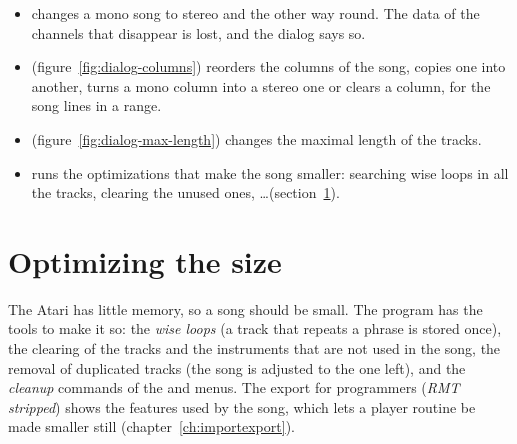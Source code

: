 \begin{itemize}
  \item {} changes a mono song to stereo and the other way round.
        The data of the channels that disappear is lost, and the dialog says so.
  \item {} (figure~\ref{fig:dialog-columns}) reorders the columns of the song, copies
        one into another, turns a mono column into a stereo one or clears a column, for the song lines in a range.
  \item {} (figure~\ref{fig:dialog-max-length}) changes the maximal length of the tracks.
  \item {} runs the optimizations that make the song smaller: searching wise loops in all the
        tracks, clearing the unused ones, \ldots (section~\ref{sec:optimize}).
\end{itemize}


\section{Optimizing the size}\label{sec:optimize}

The Atari has little memory, so a song should be small. The program has the tools to make it so:
the \emph{wise loops} (a track that repeats a phrase is stored once), the clearing of the tracks and the instruments that
are not used in the song, the removal of duplicated tracks (the song is adjusted to the one left), and the
\emph{cleanup} commands of the  and  menus. The export for programmers (\emph{RMT stripped}) shows the
features used by the song, which lets a player routine be made smaller still (chapter~\ref{ch:importexport}).
